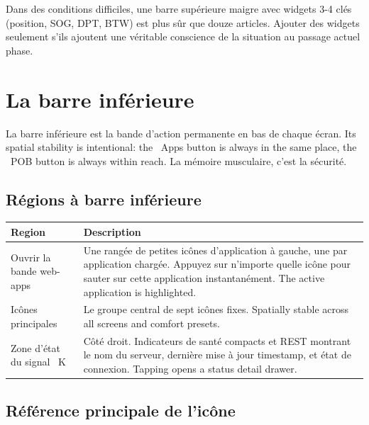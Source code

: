 \begin{tipbox}
Dans des conditions difficiles, une barre supérieure maigre avec widgets 3-4 clés (position, SOG, DPT, BTW)
est plus sûr que douze articles.
Ajouter des widgets seulement s'ils ajoutent une véritable conscience de la situation au passage actuel
phase.
\end{tipbox}

\chapter{La barre inférieure}
\label{ch:bottombar}

La barre inférieure est la bande d'action permanente en bas de chaque écran.
Its spatial stability is intentional: the ~Apps button is always
in the same place, the ~POB button is always within reach.
La mémoire musculaire, c'est la sécurité.


\section{Régions à barre inférieure}

\begin{longtable}{L{3.6cm}L{10.1cm}}
\toprule
{}
\color{white}\sffamily\bfseries Region &
\color{white}\sffamily\bfseries Description \\
\midrule
Ouvrir la bande web-apps&
Une rangée de petites icônes d'application à gauche, une par application chargée.
Appuyez sur n'importe quelle icône pour sauter sur cette application instantanément.
  The active application is highlighted. \\
Icônes principales&
Le groupe central de sept icônes fixes.
  Spatially stable across all screens and comfort presets. \\
Zone d'état du signal ~K&
Côté droit. Indicateurs de santé compacts et REST montrant le nom du serveur,
dernière mise à jour timestamp, et état de connexion.
  Tapping opens a status detail drawer. \\
\bottomrule
\end{longtable}

\section{Référence principale de l'icône}

